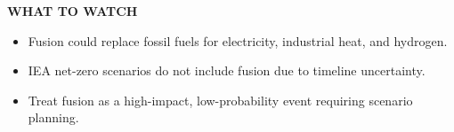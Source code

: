 \documentclass[10pt,a4paper]{article}
\begin{document}
\vspace{4pt}\noindent\begin{minipage}{\linewidth}
{\textcolor{BOGreen}{\scriptsize\bfseries WHAT TO WATCH}}\par\vspace{2pt}
{\footnotesize\begin{itemize}
\item Fusion could replace fossil fuels for electricity, industrial heat, and hydrogen.
\item IEA net-zero scenarios do not include fusion due to timeline uncertainty.
\item Treat fusion as a high-impact, low-probability event requiring scenario planning.
\end{itemize}}
\end{minipage}
\label{chap:8:end}
\end{document}
